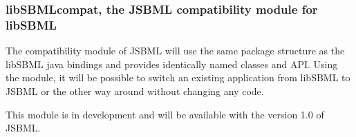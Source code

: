 \subsubsection{libSBMLcompat, the JSBML compatibility module for libSBML}

The compatibility module of JSBML will use the same package structure as the
libSBML java bindings and provides identically named classes and API. Using the
module, it will be possible to switch an existing application from libSBML to
JSBML or the other way around without changing any code.

This module is in development and will be available with the version 1.0 of
JSBML.
%
